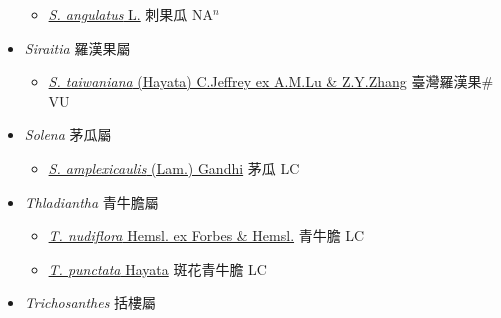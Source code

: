 \begin{itemize}
  \begin{itemize}
        \item[] \href{http://www.theplantlist.org/tpl1.1/search?q=Sicyos+angulatus}{\textit{S. angulatus} L.}   刺果瓜 NA$^n$
  \end{itemize}
 \item[] \textit{Siraitia} 羅漢果屬
                    
  \begin{itemize}
        \item[] \href{http://www.theplantlist.org/tpl1.1/search?q=Siraitia+taiwaniana}{\textit{S. taiwaniana} (Hayata) C.Jeffrey ex A.M.Lu \& Z.Y.Zhang}   臺灣羅漢果\# VU
  \end{itemize}
 \item[] \textit{Solena} 茅瓜屬
                    
  \begin{itemize}
        \item[] \href{http://www.theplantlist.org/tpl1.1/search?q=Solena+amplexicaulis}{\textit{S. amplexicaulis} (Lam.) Gandhi}   茅瓜 LC
  \end{itemize}
 \item[] \textit{Thladiantha} 青牛膽屬
                    
  \begin{itemize}
        \item[] \href{http://www.theplantlist.org/tpl1.1/search?q=Thladiantha+nudiflora}{\textit{T. nudiflora} Hemsl. ex Forbes \& Hemsl.}   青牛膽 LC
        \item[] \href{http://www.theplantlist.org/tpl1.1/search?q=Thladiantha+punctata}{\textit{T. punctata} Hayata}   斑花青牛膽 LC
  \end{itemize}
 \item[] \textit{Trichosanthes} 括樓屬
                    

\end{itemize}
